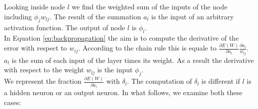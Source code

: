 Looking inside node $l$ we find the weighted sum of the inputs of the node including
$\phi_{j}w_{lj}$. The result of the summation $a_{l}$ is the input of an
arbitrary activation function. The output of node $l$ is $\phi_{l}$.\\ In Equation
\ref{eq:backpropagation} the aim is to compute the derivative of the error with respect
to $w_{ij}$. According to the chain rule this is equale to
$\frac{\partial E(W)}{\partial a_{l}}\frac{\partial a_{l}}{w_{lj}}$. $a_{l}$ is the
sum of each input of the layer times its weight. As a result the derivative with
respect to the weight $w_{lj}$ is the input $\phi_{j}$. \\ We represent the fraction
$\frac{\partial E(W)}{\partial a_{i}}$ with $\delta_{l}$. The computation of
$\delta_{l}$ is different if $l$ is a hidden neuron or an output neuron. In what
follows, we examine both these cases:
